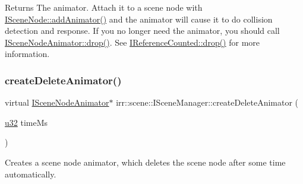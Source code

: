 \begin{DoxyReturn}{Returns}
The animator. Attach it to a scene node with \hyperlink{classirr_1_1scene_1_1ISceneNode_a0e5cd342cd7293c136e53e2c2c5e0f3a}{I\+Scene\+Node\+::add\+Animator()} and the animator will cause it to do collision detection and response. If you no longer need the animator, you should call \hyperlink{classirr_1_1IReferenceCounted_a03856a09355b89d178090c4a5f738543}{I\+Scene\+Node\+Animator\+::drop()}. See \hyperlink{classirr_1_1IReferenceCounted_a03856a09355b89d178090c4a5f738543}{I\+Reference\+Counted\+::drop()} for more information. 
\end{DoxyReturn}
\mbox{\label{classirr_1_1scene_1_1ISceneManager_a163cc04ff2cb03852ac891de56200fa3}} 
\subsubsection{\texorpdfstring{create\+Delete\+Animator()}{createDeleteAnimator()}\hspace{0.1cm}{\footnotesize\ttfamily [1/2]}}
{\footnotesize\ttfamily virtual \hyperlink{classirr_1_1scene_1_1ISceneNodeAnimator}{I\+Scene\+Node\+Animator}$\ast$ irr\+::scene\+::\+I\+Scene\+Manager\+::create\+Delete\+Animator (\begin{DoxyParamCaption}\item[{\hyperlink{namespaceirr_a0416a53257075833e7002efd0a18e804}{u32}}]{time\+Ms }\end{DoxyParamCaption})\hspace{0.3cm}{\ttfamily [pure virtual]}}



Creates a scene node animator, which deletes the scene node after some time automatically. 


